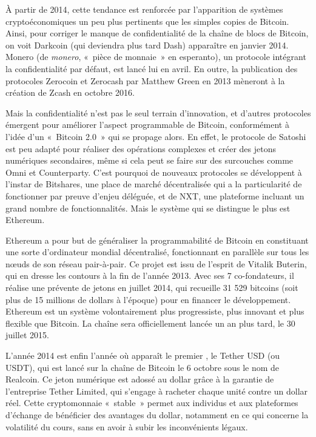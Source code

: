 À partir de 2014, cette tendance est renforcée par l'apparition de systèmes cryptoéconomiques un peu plus pertinents que les simples copies de Bitcoin. Ainsi, pour corriger le manque de confidentialité de la chaîne de blocs de Bitcoin, on voit Darkcoin (qui deviendra plus tard Dash) apparaître en janvier 2014. Monero (de \emph{monero}, «~pièce de monnaie~» en esperanto), un protocole intégrant la confidentialité par défaut, est lancé lui en avril. En outre, la publication des protocoles Zerocoin et Zerocash par Matthew Green en 2013 mèneront à la création de Zcash en octobre 2016.

Mais la confidentialité n'est pas le seul terrain d'innovation, et d'autres protocoles émergent pour améliorer l'aspect programmable de Bitcoin, conformément à l'idée d'un «~Bitcoin 2.0~» qui se propage alors. En effet, le protocole de Satoshi est peu adapté pour réaliser des opérations complexes et créer des jetons numériques secondaires, même si cela peut se faire sur des surcouches comme Omni et Counterparty. C'est pourquoi de nouveaux protocoles se développent à l'instar de Bitshares, une place de marché décentralisée qui a la particularité de fonctionner par preuve d'enjeu déléguée, et de NXT, une plateforme incluant un grand nombre de fonctionnalités. Mais le système qui se distingue le plus est Ethereum.

Ethereum a pour but de généraliser la programmabilité de Bitcoin en constituant une sorte d'ordinateur mondial décentralisé, fonctionnant en parallèle sur tous les nœuds de son réseau pair-à-pair. Ce projet est issu de l'esprit de Vitalik Buterin, qui en dresse les contours à la fin de l'année 2013. Avec ses 7 co-fondateurs, il réalise une prévente de jetons en juillet 2014, qui recueille 31 529 bitcoins (soit plus de 15 millions de dollars à l'époque) pour en financer le développement. Ethereum est un système volontairement plus progressiste, plus innovant et plus flexible que Bitcoin. La chaîne sera officiellement lancée un an plus tard, le 30 juillet 2015.

L'année 2014 est enfin l'année où apparaît le premier , le Tether USD (ou USDT), qui est lancé sur la chaîne de Bitcoin le 6 octobre sous le nom de Realcoin. Ce jeton numérique est adossé au dollar grâce à la garantie de l'entreprise Tether Limited, qui s'engage à racheter chaque unité contre un dollar réel. Cette cryptomonnaie «~stable~» permet aux individus et aux plateformes d'échange de bénéficier des avantages du dollar, notamment en ce qui concerne la volatilité du cours, sans en avoir à subir les inconvénients légaux.

